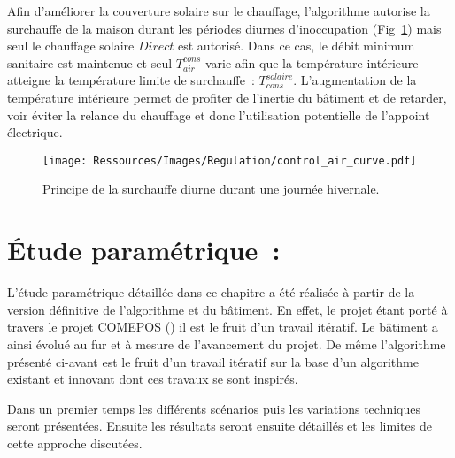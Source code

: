 Afin d’améliorer la couverture solaire sur le chauffage, l’algorithme autorise la
surchauffe de la maison durant les périodes diurnes d’inoccupation
(Fig~\ref{fig:control_air}) mais seul le chauffage solaire $Direct$ est autorisé. Dans ce
cas, le débit minimum sanitaire est maintenue et seul $T_{air}^{cons}$ varie afin que la
température intérieure atteigne la température limite de surchauffe~:
$T_{cons}^{solaire}$. L’augmentation de la température intérieure permet de profiter de
l’inertie du bâtiment et de retarder, voir éviter la relance du chauffage et donc
l’utilisation potentielle de l’appoint électrique.
\begin{figure}
    \begin{center}
        \texttt{[image: Ressources/Images/Regulation/control\_air\_curve.pdf]}
    \end{center}
    \caption{Principe de la surchauffe diurne durant une journée hivernale.
             \label{fig:control_air}}
\end{figure}








\section{Étude paramétrique~:} %
\label{sec:etude_parametrique_}
L’étude paramétrique détaillée dans ce chapitre a été réalisée à partir de la
version définitive de l’algorithme et du bâtiment. En effet, le projet étant
porté à travers le projet COMEPOS ()
il est le fruit d’un travail itératif. Le bâtiment a ainsi évolué au fur et à mesure
de l’avancement du projet. De même l’algorithme présenté ci-avant est le fruit d’un
travail itératif sur la base d’un algorithme existant et innovant dont
ces travaux se sont inspirés.

Dans un premier temps les différents scénarios puis les variations techniques
seront présentées. Ensuite les résultats seront ensuite détaillés et les limites
de cette approche discutées.


